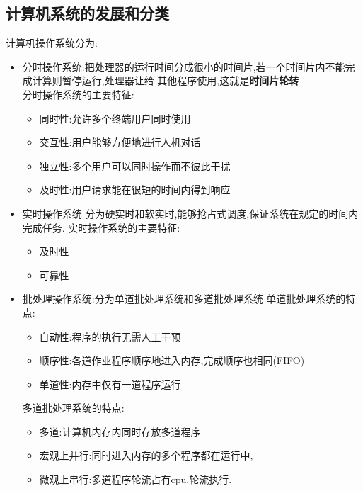 \documentclass{ctexart}
\begin{document}
\subsection{计算机系统的发展和分类}
计算机操作系统分为:
\begin{itemize}
    \item 分时操作系统:把处理器的运行时间分成很小的时间片,若一个时间片内不能完成计算则暂停运行,处理器让给
    其他程序使用,这就是\textbf{时间片轮转}\\
    分时操作系统的主要特征:
    \begin{itemize}
        \item 同时性:允许多个终端用户同时使用
        \item 交互性:用户能够方便地进行人机对话
        \item 独立性:多个用户可以同时操作而不彼此干扰
        \item 及时性:用户请求能在很短的时间内得到响应
    \end{itemize}
    \item 实时操作系统
    分为硬实时和软实时,能够抢占式调度,保证系统在规定的时间内完成任务.
    实时操作系统的主要特征:
    \begin{itemize}
        \item 及时性
        \item 可靠性
    \end{itemize}
    \item 批处理操作系统:分为单道批处理系统和多道批处理系统
    单道批处理系统的特点:
    \begin{itemize}
    \item 自动性:程序的执行无需人工干预
    \item 顺序性:各道作业程序顺序地进入内存,完成顺序也相同(FIFO)
    \item 单道性:内存中仅有一道程序运行
    \end{itemize}
    多道批处理系统的特点:
    \begin{itemize}
        \item 多道:计算机内存内同时存放多道程序
        \item 宏观上并行:同时进入内存的多个程序都在运行中,
        \item 微观上串行:多道程序轮流占有cpu,轮流执行.
    \end{itemize}
\end{itemize}
\end{document}
